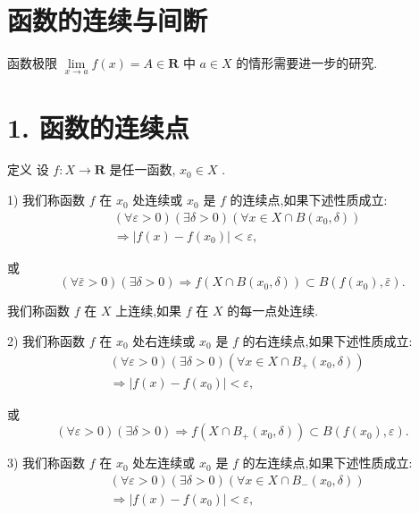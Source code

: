 \section{函数的连续与间断}

函数极限 $\mathop{\lim }\limits_{{x \rightarrow  a}}f\left( x\right)  = A \in  \mathbf{R}$ 中 $a \in  X$ 的情形需要进一步的研究.

\section*{1. 函数的连续点}

定义 设 $f : X \rightarrow  \mathbf{R}$ 是任一函数, ${x}_{0} \in  X$ .

1) 我们称函数 $f$ 在 ${x}_{0}$ 处连续或 ${x}_{0}$ 是 $f$ 的连续点,如果下述性质成立:
\begin{align*}
	&\left( {\forall \varepsilon  > 0}\right) \left( {\exists \delta  > 0}\right) \left( {\forall x \in  X \cap  B\left( {{x}_{0},\delta }\right) }\right)\\
	&\Rightarrow  \left| {f\left( x\right)  - f\left( {x}_{0}\right) }\right|  < \varepsilon ,
\end{align*}

或
$$\left( {\forall \bar{\varepsilon } > 0}\right) \left( {\exists \delta  > 0}\right)  \Rightarrow  f\left( {X \cap  B\left( {{x}_{0},\delta }\right) }\right)  \subset  B\left( {f\left( {x}_{0}\right) ,\bar{\varepsilon }}\right) .$$

我们称函数 $f$ 在 $X$ 上连续,如果 $f$ 在 $X$ 的每一点处连续.

2) 我们称函数 $f$ 在 ${x}_{0}$ 处右连续或 ${x}_{0}$ 是 $f$ 的右连续点,如果下述性质成立:
\begin{align*}
	&\left( {\forall \varepsilon  > 0}\right) \left( {\exists \delta  > 0}\right) \left( {\forall x \in  X \cap  {B}_{ + }\left( {{x}_{0},\delta }\right) }\right)\\
	&\Rightarrow  \left| {f\left( x\right)  - f\left( {x}_{0}\right) }\right|  < \varepsilon ,
\end{align*}

或
$$\left( {\forall \varepsilon  > 0}\right) \left( {\exists \delta  > 0}\right)  \Rightarrow  f\left( {X \cap  {B}_{ + }\left( {{x}_{0},\delta }\right) }\right)  \subset  B\left( {f\left( {x}_{0}\right) ,\varepsilon }\right) .$$

3) 我们称函数 $f$ 在 ${x}_{0}$ 处左连续或 ${x}_{0}$ 是 $f$ 的左连续点,如果下述性质成立:
\begin{align*}
	&\left( {\forall \varepsilon  > 0}\right) \left( {\exists \delta  > 0}\right) \left( {\forall x \in  X \cap  {B}_{ - }\left( {{x}_{0},\delta }\right) }\right)\\
	&\Rightarrow  \left| {f\left( x\right)  - f\left( {x}_{0}\right) }\right|  < \varepsilon ,
\end{align*}

